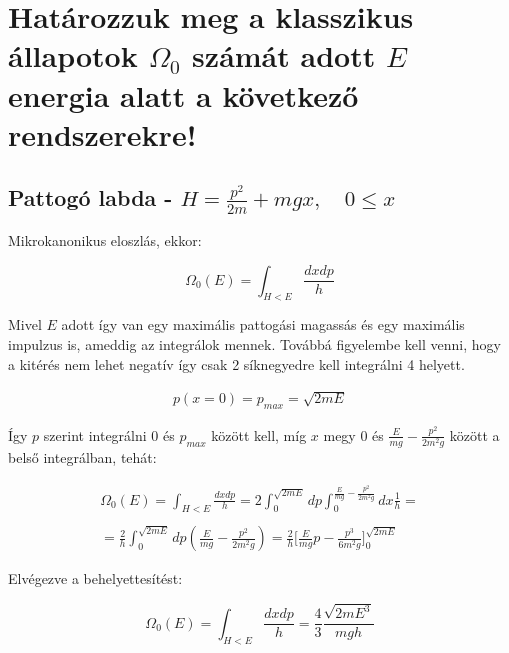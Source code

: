 \documentclass[a4paper,12pt]{article}
\begin{document}
\section{Határozzuk meg a klasszikus állapotok $\Omega_{0}$ számát adott $E$ energia alatt a következő rendszerekre!}

\subsection{Pattogó labda - $H = \frac{p^{2}}{2m} + mgx, \quad 0 \leq  x$}

\par Mikrokanonikus eloszlás, ekkor:

\begin{equation*}
\Omega_0(E) = \int_{H < E}\frac{dxdp}{h} 
\end{equation*}

\par Mivel $E$ adott így van egy maximális pattogási magassás és egy maximális impulzus is, ameddig az integrálok mennek. Továbbá figyelembe kell venni, hogy a kitérés nem lehet negatív így csak 2 síknegyedre kell integrálni 4 helyett.

\begin{gather*}
p(x = 0) = p_{max} = \sqrt{2mE} 
\end{gather*}

\par Így $p$ szerint integrálni $0$ és $p_{max}$ között kell, míg $x$ megy 0 és $\frac{E}{mg} - \frac{p^{2}}{2m^{2}g}$ között a belső integrálban, tehát:

\begin{equation*}
\begin{gathered}
\Omega_0(E) = \int_{H < E}\frac{dxdp}{h} = 2\int_{0}^{\sqrt{2mE}}dp\int_{0}^{\frac{E}{mg} - \frac{p^{2}}{2m^{2}g}}dx \frac{1}{h} = \\ \\
= \frac{2}{h}\int_{0}^{\sqrt{2mE}}dp(\frac{E}{mg} - \frac{p^{2}}{2m^{2}g}) = \frac{2}{h}\Big[\frac{E}{mg}p - \frac{p^{3}}{6m^{2}g}\Big]_{0}^{\sqrt{2mE}}
\end{gathered}
\end{equation*}

\par Elvégezve a behelyettesítést:

\begin{equation}
\Omega_0(E) = \int_{H < E}\frac{dxdp}{h} = \frac{4}{3}\frac{\sqrt{2mE^{3}}}{mgh}
\end{equation}
\end{document}
